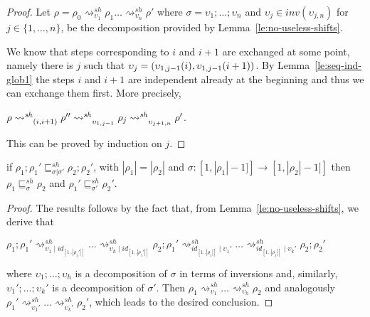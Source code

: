 \documentclass{llncs}
\newcommand{\interval}[2][1]{\ensuremath{[{#1},{#2}]}}
\newcommand{\perm}{\sigma}
\newcommand{\inv}[1]{\ensuremath{inv}({#1})}
\newcommand{\shiftdir}[1][]{\ensuremath{\mathrel{{\rightsquigarrow}^{\mathit{sh}}_{#1}}}}
\newcommand{\shiftpre}[1][]{\ensuremath{\mathrel{{\sqsubseteq}^{\mathit{sh}}_{#1}}}}
\begin{document}
\begin{proof}
  Let
  $\rho = \rho_0 \shiftdir[\upsilon_1] \rho_1 \ldots
  \shiftdir[\upsilon_n] \rho'$ where $\sigma = \upsilon_1; \ldots; \upsilon_n$ and $\upsilon_j \in \inv{\upsilon_{j,n}}$ for $j \in \{1, \ldots,n\}$, be the decomposition
  provided by Lemma~\ref{le:no-useless-shifts}.
  
  We know that steps corresponding to $i$ and $i+1$ are exchanged at
  some point, namely there is $j$ such that
  $\upsilon_j =
  \transp{\upsilon_{1,j-1}(i)}[\upsilon_{1,j-1}(i+1)]$. By
  Lemma~\ref{le:seq-ind-glob1} the steps $i$ and $i+1$ are independent
  already at the beginning and thus we can exchange them first.
  More precisely, 
  \begin{center}
    $\rho \shiftdir_{\transp{i}} \rho'' \shiftdir_{\upsilon_{1,j-1}}
    \rho_j \shiftdir_{\upsilon_{j+1,n}} \rho'$.
  \end{center}
  This can be proved by induction on $j$.
\end{proof}

\begin{lemma}
  \label{le:more-shift}
  if $\rho_1;\rho_1' \shiftpre[\perm | \perm'] \rho_2; \rho_2'$,
  with $|\rho_1| = |\rho_2|$ and
  $\sigma : \interval{|\rho_1|-1]} \to \interval{|\rho_2|-1]}$ then
  $\rho_1 \shiftpre[\perm] \rho_2$ and
  $\rho_1' \shiftpre[\perm'] \rho_2'$.
\end{lemma}

\begin{proof}
  The results follows by the fact that, from
  Lemma~\ref{le:no-useless-shifts}, we derive that
  \begin{center} 
    $\rho_1;\rho_1' \shiftdir[ \upsilon_1 \mid id_{[1..|\rho_1'|]}]
    \ldots \shiftdir[ \upsilon_h \mid id_{[1..|\rho_1'|]}] \rho_2;
    \rho_1' \shiftdir[ id_{[1..|\rho_1|]} \mid \upsilon_1'] \ldots
    \shiftdir[ id_{[1..|\rho_1|]} \mid \upsilon_k'] \rho_2; \rho_2'$
  \end{center}
  where $\upsilon_1; \ldots; \upsilon_h$ is a decomposition of $\perm$
  in terms of inversions and, similarly,
  $\upsilon_1'; \ldots; \upsilon_k'$ is a decomposition of
  $\perm'$. Then
  $\rho_1 \shiftdir[\upsilon_1] \ldots \shiftdir[\upsilon_h] \rho_2$
  and analogously
  $\rho_1' \shiftdir[\upsilon_1'] \ldots \shiftdir[\upsilon_k']
  \rho_2'$, which leads to the desired conclusion.
\end{proof}

\end{document}

